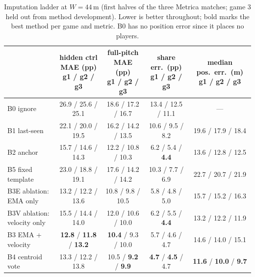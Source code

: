 \documentclass[11pt]{article}
\begin{document}
\begin{table}[t]
\centering
\caption{Imputation ladder at $W = 44$\,m (first halves of the three Metrica
matches; game 3 held out from method development). Lower is better
throughout; bold marks the best method per game and metric. B0 has no position
error since it places no players.}
\label{tab:ladder}
\small
\begin{tabular}{lcccc}
\toprule
& \shortstack{hidden ctrl MAE (pp)\\g1 / g2 / g3} & \shortstack{full-pitch MAE (pp)\\g1 / g2 / g3} & \shortstack{share err.\ (pp)\\g1 / g2 / g3} & \shortstack{median pos.\ err.\ (m)\\g1 / g2 / g3} \\
\midrule
B0 ignore                    & 26.9 / 25.6 / 25.1 & 18.6 / 17.2 / 16.7 & 13.4 / 12.5 / 11.1 & --- \\
B1 last-seen                 & 22.1 / 20.0 / 19.5 & 16.2 / 14.2 / 13.5 & 10.6 / 9.5 / 8.2   & 19.6 / 17.9 / 18.4 \\
B2 anchor                    & 15.7 / 14.6 / 14.3 & 12.2 / 10.8 / 10.3 & 6.2 / 5.4 / \textbf{4.4} & 13.6 / 12.8 / 12.5 \\
B5 fixed template            & 23.0 / 18.8 / 19.1 & 17.6 / 14.2 / 14.2 & 10.3 / 7.7 / 6.9   & 22.7 / 20.7 / 21.9 \\
B3E ablation: EMA only       & 13.2 / 12.2 / 13.6 & 10.8 / 9.8 / 10.5 & 5.8 / 4.8 / 5.0    & 15.7 / 15.2 / 16.3 \\
B3V ablation: velocity only  & 15.5 / 14.4 / 14.0 & 12.0 / 10.6 / 10.0 & 6.2 / 5.5 / \textbf{4.4} & 13.2 / 12.2 / 11.9 \\
B3 EMA + velocity            & \textbf{12.8} / \textbf{11.8} / \textbf{13.2} & \textbf{10.4} / 9.3 / 10.0 & 5.7 / 4.6 / 4.7 & 14.6 / 14.0 / 15.1 \\
B4 centroid vote             & 13.3 / 12.2 / 13.8 & 10.5 / \textbf{9.2} / \textbf{9.9} & \textbf{4.7} / \textbf{4.5} / 4.7 & \textbf{11.6} / \textbf{10.0} / \textbf{9.7} \\
\bottomrule
\end{tabular}
\end{table}
\end{document}
